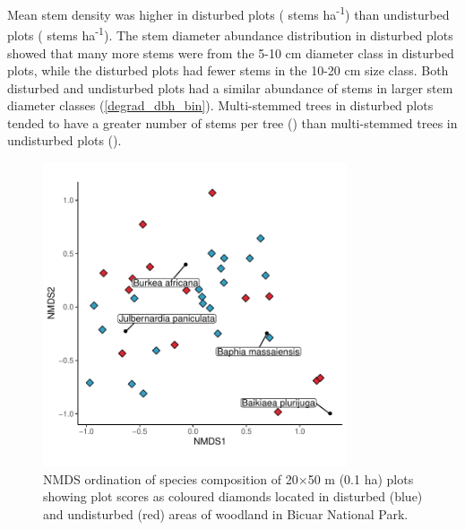 \documentclass[diversity,article,submit,moreauthors,pdftex]{Definitions/mdpi}
\begin{document}
Mean stem density was higher in disturbed plots (\stemdensdegrad{} stems ha\textsuperscript{-1}) than undisturbed plots (\stemdensbicuar{} stems ha\textsuperscript{-1}). The stem diameter abundance distribution in disturbed plots showed that many more stems were from the 5-10 cm diameter class in disturbed plots, while the disturbed plots had fewer stems in the 10-20 cm size class. Both disturbed and undisturbed plots had a similar abundance of stems in larger stem diameter classes (\autoref{degrad_dbh_bin}). Multi-stemmed trees in disturbed plots tended to have a greater number of stems per tree (\multistemdegrad{}) than multi-stemmed trees in undisturbed plots (\multistembicuar{}).

\begin{figure}[H]
\centering
	\includegraphics[width=0.8\textwidth]{img/bicuar_degrad_nmds}
	\caption{NMDS ordination of species composition of 20$\times$50 m (0.1 ha) plots showing plot scores as coloured diamonds located in disturbed (blue) and undisturbed (red) areas of woodland in Bicuar National Park.}
	\label{bicuar_degrad_nmds}
\end{figure}
\end{document}
